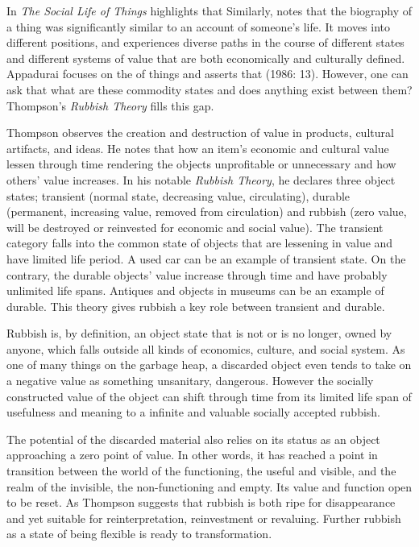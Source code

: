 In \textit{The Social Life of Things} \citet[3]{appadurai1986social} highlights that  Similarly, \citet[66]{kopytoff1986cultural} notes that the biography of a thing was significantly similar to an account of someone’s life. It moves into different positions, and experiences diverse paths in the course of different states and different systems of value that are both economically and culturally defined. Appadurai focuses on the  of things and asserts that  (1986: 13). However, one can ask that what are these commodity states and does anything exist between them? Thompson’s \textit{Rubbish Theory} fills this gap.

Thompson observes the creation and destruction of value in products, cultural artifacts, and ideas. He notes that how an item’s economic and cultural value lessen through time rendering the objects unprofitable or unnecessary and how others’ value increases. In his notable \textit{Rubbish Theory}, he declares three object states; transient (normal state, decreasing value, circulating), durable (permanent, increasing value, removed from circulation) and rubbish (zero value, will be destroyed or reinvested for economic and social value). The transient category falls into the common state of objects that are lessening in value and have limited life period. A used car can be an example of transient state. On the contrary, the durable objects’ value increase through time and have probably unlimited life spans. Antiques and objects in museums can be an example of durable. This theory gives rubbish a key role between transient and durable.

Rubbish is, by definition, an object state that is not or is no longer, owned by anyone, which falls outside all kinds of economics, culture, and social system. As one of many things on the garbage heap, a discarded object even tends to take on a negative value as something unsanitary, dangerous. However the socially constructed value of the object can shift through time from its limited life span of usefulness and meaning to a infinite and valuable socially accepted rubbish.

The potential of the discarded material also relies on its status as an object approaching a zero point of value. In other words, it has reached a point in transition between the world of the functioning, the useful and visible, and the realm of the invisible, the non-functioning and empty. Its value and function open to be reset. As Thompson suggests that rubbish is both ripe for disappearance and yet suitable for reinterpretation, reinvestment or revaluing. Further rubbish as a state of being flexible is ready to transformation.

